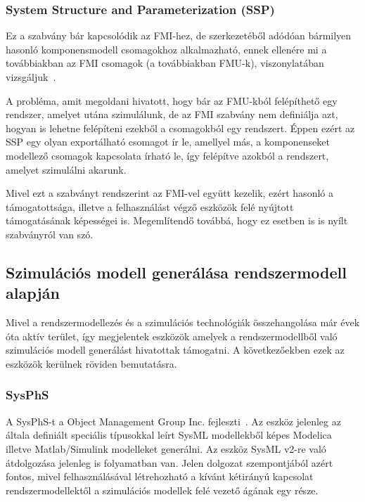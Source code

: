         \subsubsection{System Structure and Parameterization (SSP)} \label{sec:ssp}
        Ez a szabvány bár kapcsolódik az FMI-hez, de szerkezetéből adódóan bármilyen hasonló
        komponensmodell csomagokhoz alkalmazható, ennek ellenére mi a továbbiakban az FMI csomagok (a
        továbbiakban FMU-k), viszonylatában vizsgáljuk~\cite{SSP2022}.
        
        A probléma, amit megoldani hivatott, hogy bár az FMU-kból felépíthető egy rendszer, amelyet utána szimulálunk,
        de az FMI szabvány nem definiálja azt, hogyan is lehetne felépíteni ezekből a csomagokból egy rendszert.
        Éppen ezért az SSP egy olyan exportálható csomagot ír le, amellyel más, a komponenseket modellező csomagok kapcsolata írható le,
        így felépítve azokból a rendszert, amelyet szimulálni akarunk.
        
        Mivel ezt a szabványt rendszerint az FMI-vel együtt kezelik, ezért hasonló a támogatottsága, illetve a felhasználást végző eszközök felé nyújtott
        támogatásának képességei is. Megemlítendő továbbá, hogy ez esetben is is nyílt szabványról van szó.

    \subsection{Szimulációs modell generálása rendszermodell alapján}
    Mivel a rendszermodellezés és a szimulációs technológiák összehangolása már évek óta aktív terület, így megjelentek eszközök amelyek a rendszermodellből való szimulációs modell generálást hivatottak támogatni. A következőekben ezek az eszközök kerülnek röviden bemutatásra.

        \subsubsection{SysPhS} \label{sec:SysPhS}
        A SysPhS-t a Object Management Group Inc. fejleszti~\cite{SysPhS2021}. Az eszköz jelenleg az általa definiált speciális típusokkal leírt SysML modellekből képes Modelica illetve Matlab/Simulink modelleket generálni.
        Az eszköz SysML v2-re való átdolgozása jelenleg is folyamatban van. Jelen dolgozat szempontjából azért fontos, mivel felhasználásával létrehozható a kívánt kétirányú kapcsolat rendszermodellektől a szimulációs modellek felé vezető ágának egy része.


